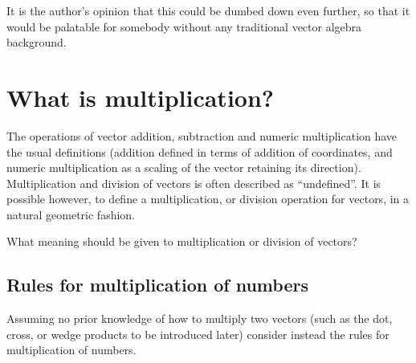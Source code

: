 It is the author's opinion that this could be dumbed down even further, so that it would be palatable for
somebody without any traditional vector algebra background.

\section{What is multiplication?}

The operations of vector addition, subtraction and numeric multiplication have the usual definitions
(addition defined in terms of addition of coordinates, and numeric multiplication as a scaling of the vector retaining its direction).  Multiplication and division of vectors is often described as ``undefined''.  It is possible however, to define a multiplication, or division operation for vectors, in a natural geometric fashion.

What meaning should be given to multiplication or division of vectors?

\subsection{Rules for multiplication of numbers}

Assuming no prior knowledge of how to multiply two vectors (such as the dot, cross, or wedge products to be introduced later) consider instead the rules for multiplication of numbers.

